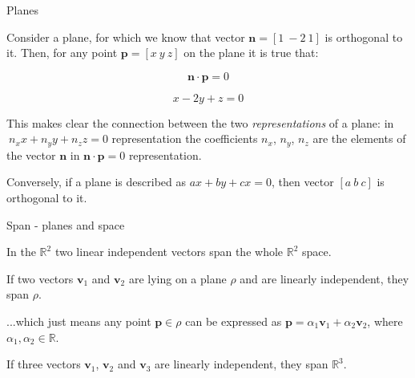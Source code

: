 \documentclass{beamer}
\begin{document}
\begin{frame}{Planes}
	\begin{flushleft}
		
		Consider a plane, for which we know that vector $\mathbf n = [1 \ -2 \ 1]$ is orthogonal to it. Then, for any point  $\mathbf p = [x \ y \ z]$ on the plane it is true that:

		\begin{equation}
			\mathbf n \cdot \mathbf p = 0
		\end{equation}
	
	\begin{equation}
		x - 2y + z = 0
	\end{equation}
		
		\bigskip
		
		This makes clear the connection between the two \emph{representations} of a plane: in $\ n_x x + n_y y + n_z z = 0$ representation the coefficients $n_x$, $n_y$, $n_z$ are the elements of the vector $\mathbf n$ in $\mathbf n \cdot \mathbf p = 0$ representation.
		
		\bigskip
		
		Conversely, if a plane is described as $ax+by+cx = 0$, then vector $[a \ b \ c]$ is orthogonal to it.
		
	\end{flushleft}
\end{frame}



\begin{frame}{Span - planes and space}
	\begin{flushleft}
		
		In the $\mathbb R^2$ two linear independent vectors span the whole $\mathbb R^2$ space. 
		
		\begin{theorem}
			If two vectors $\mathbf v_1$ and  $\mathbf v_2$ are lying on a plane $\rho$ and are linearly independent, they span  $\rho$.
		\end{theorem}
		
		...which just means any point $\mathbf p \in \rho$ can be expressed as $\mathbf p = \alpha_1 \mathbf v_1 + \alpha_2 \mathbf v_2$, where $\alpha_1, \alpha_2 \in \mathbb R$.
		
		\bigskip
		
		\begin{theorem}
	If three vectors $\mathbf v_1$,  $\mathbf v_2$ and $\mathbf v_3$ are linearly independent, they span  $\mathbb R^3$.
		\end{theorem}		
		
	\end{flushleft}
\end{frame}
\end{document}
